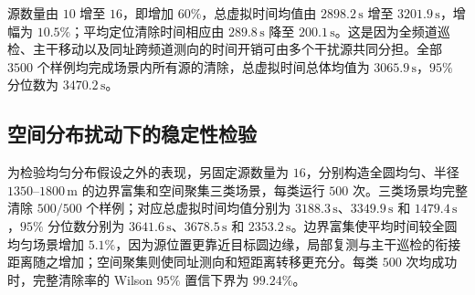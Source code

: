 \begin{table}[H]
  \centering
  \caption{问题三在 $10$--$16$ 个干扰源下的运行结果}
  \label{tab:p3-source-count}
\end{table}

源数量由 $10$ 增至 $16$，即增加 $60\%$，总虚拟时间均值由 $2898.2\,\mathrm s$ 增至 $3201.9\,\mathrm s$，增幅为 $10.5\%$；平均定位清除时间相应由 $289.8\,\mathrm s$ 降至 $200.1\,\mathrm s$。这是因为全频道巡检、主干移动以及同址跨频道测向的时间开销可由多个干扰源共同分担。全部 $3500$ 个样例均完成场景内所有源的清除，总虚拟时间总体均值为 $3065.9\,\mathrm s$，$95\%$ 分位数为 $3470.2\,\mathrm s$。

\subsection{空间分布扰动下的稳定性检验}

为检验均匀分布假设之外的表现，另固定源数量为 $16$，分别构造全圆均匀、半径 $1350$--$1800\,\mathrm m$ 的边界富集和空间聚集三类场景，每类运行 $500$ 次。三类场景均完整清除 $500/500$ 个样例；对应总虚拟时间均值分别为 $3188.3\,\mathrm s$、$3349.9\,\mathrm s$ 和 $1479.4\,\mathrm s$，$95\%$ 分位数分别为 $3641.6\,\mathrm s$、$3678.5\,\mathrm s$ 和 $2353.2\,\mathrm s$。边界富集使平均时间较全圆均匀场景增加 $5.1\%$，因为源位置更靠近目标圆边缘，局部复测与主干巡检的衔接距离随之增加；空间聚集则使同址测向和短距离转移更充分。每类 $500$ 次均成功时，完整清除率的 Wilson $95\%$ 置信下界为 $99.24\%$。

